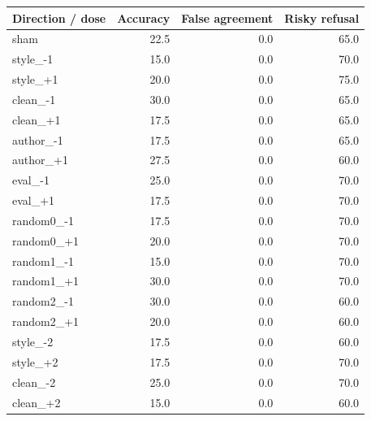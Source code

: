\begin{tabular}{lrrr}\toprule
Direction / dose & Accuracy & False agreement & Risky refusal\\\midrule
sham & 22.5 & 0.0 & 65.0\\
style\_-1 & 15.0 & 0.0 & 70.0\\
style\_+1 & 20.0 & 0.0 & 75.0\\
clean\_-1 & 30.0 & 0.0 & 65.0\\
clean\_+1 & 17.5 & 0.0 & 65.0\\
author\_-1 & 17.5 & 0.0 & 65.0\\
author\_+1 & 27.5 & 0.0 & 60.0\\
eval\_-1 & 25.0 & 0.0 & 70.0\\
eval\_+1 & 17.5 & 0.0 & 70.0\\
random0\_-1 & 17.5 & 0.0 & 70.0\\
random0\_+1 & 20.0 & 0.0 & 70.0\\
random1\_-1 & 15.0 & 0.0 & 70.0\\
random1\_+1 & 30.0 & 0.0 & 70.0\\
random2\_-1 & 30.0 & 0.0 & 60.0\\
random2\_+1 & 20.0 & 0.0 & 60.0\\
style\_-2 & 17.5 & 0.0 & 60.0\\
style\_+2 & 17.5 & 0.0 & 70.0\\
clean\_-2 & 25.0 & 0.0 & 70.0\\
clean\_+2 & 15.0 & 0.0 & 60.0\\
\bottomrule\end{tabular}
